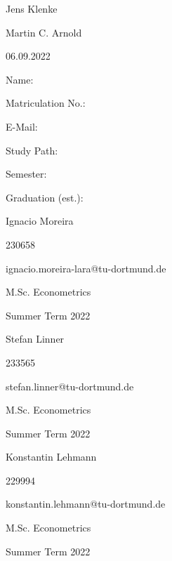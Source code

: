 \documentclass[10pt,a4paper]{article}
\begin{document}
\begin{titlepage}
		\noindent\begin{minipage}[t]{0.3\textwidth}
		\end{minipage}
		\begin{minipage}[t]{0.7\textwidth}
			\hspace{1cm}Jens Klenke 
		\end{minipage}
	
			\noindent\begin{minipage}[t]{0.3\textwidth}
		\end{minipage}
		\begin{minipage}[t]{0.7\textwidth}
			\hspace{1cm}Martin C. Arnold 
		\end{minipage}
	
		\noindent\begin{minipage}[t]{0.3\textwidth}
		\end{minipage}
		\begin{minipage}[t]{0.7\textwidth}
			\hspace{1cm}06.09.2022
		\end{minipage}
	\vfill
		\hrulefill
		
		\begin{multicols}{4}
			
			Name:
			
			Matriculation No.:
			
			E-Mail:
			
			Study Path:
			
			Semester:
			
			Graduation (est.):
			
			\columnbreak
			
			Ignacio Moreira
			
			230658
			
			ignacio.moreira-lara@tu-dortmund.de
			
			M.Sc. Econometrics
			
			
			Summer Term 2022
			
			\columnbreak
			
			Stefan Linner
			
			233565
			
			stefan.linner@tu-dortmund.de
			
			M.Sc. Econometrics
			
			
			Summer Term 2022
			
			\columnbreak
			
			Konstantin Lehmann
			
			229994
			
			konstantin.lehmann@tu-dortmund.de
			
			M.Sc. Econometrics
			
			
			Summer Term 2022
			
		\end{multicols}
		
	\end{titlepage}
	
\end{document}
